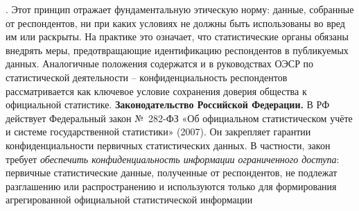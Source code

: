 . Этот принцип отражает фундаментальную этическую норму: данные, собранные от респондентов, ни при каких условиях не должны быть использованы во вред им или раскрыты. На практике это означает, что статистические органы обязаны внедрять меры, предотвращающие идентификацию респондентов в публикуемых данных. Аналогичные положения содержатся и в руководствах ОЭСР по статистической деятельности – конфиденциальность респондентов рассматривается как ключевое условие сохранения доверия общества к официальной статистике. \textbf{Законодательство Российской Федерации.} В РФ действует Федеральный закон № 282-ФЗ «Об официальном статистическом учёте и системе государственной статистики» (2007). Он закрепляет гарантии конфиденциальности первичных статистических данных. В частности, закон требует \textit{обеспечить конфиденциальность информации ограниченного доступа}: первичные статистические данные, полученные от респондентов, не подлежат разглашению или распространению и используются только для формирования агрегированной официальной статистической информации
\autocite{rg-ru}
